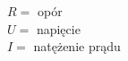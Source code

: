 \documentclass[varwidth]{standalone}
\begin{document}
\begin{center}\scalebox{2}{$R = U / I$}\end{center}

\begin{center}\scalebox{1.5}{$U = I · R \qquad I = U / R$}\end{center}

$R = $ opór\\
$U = $ napięcie\\
$I = $ natężenie prądu
\end{document}

